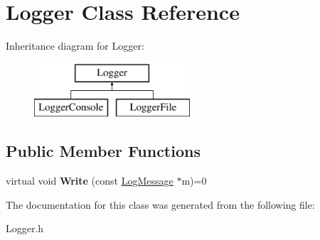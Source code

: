 \hypertarget{class_logger}{\section{Logger Class Reference}
\label{class_logger}
}
Inheritance diagram for Logger\-:\begin{figure}[H]
\begin{center}
\leavevmode
\includegraphics[height=2.000000cm]{class_logger}
\end{center}
\end{figure}
\subsection*{Public Member Functions}
\begin{DoxyCompactItemize}
\item 
\hypertarget{class_logger_a11d7b1eea5db70a85b63c30d426dee56}{virtual void {\bfseries Write} (const \hyperlink{class_log_message}{Log\-Message} $\ast$m)=0}\label{class_logger_a11d7b1eea5db70a85b63c30d426dee56}

\end{DoxyCompactItemize}


The documentation for this class was generated from the following file\-:\begin{DoxyCompactItemize}
\item 
Logger.\-h\end{DoxyCompactItemize}

